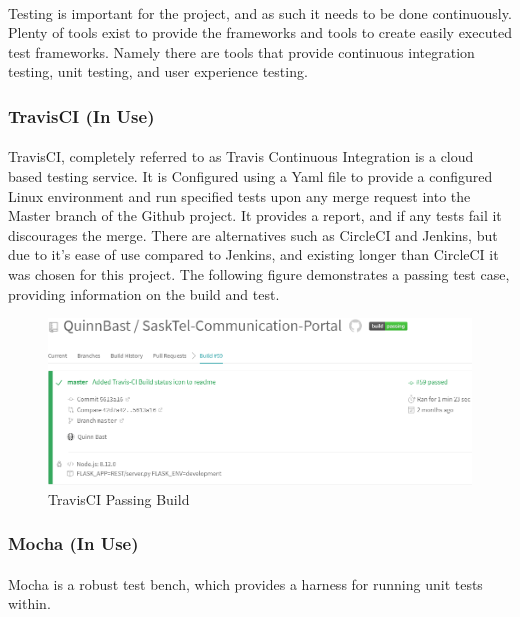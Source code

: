 \documentclass[12pt]{article}
\begin{document}
\paragraph{}	Testing is important for the project, and as such it needs to be done continuously. Plenty of tools exist to provide the frameworks and tools to create easily executed test frameworks. Namely there are tools that provide continuous integration testing, unit testing, and user experience testing. 

\subsubsection{TravisCI (In Use)}
\paragraph{}	TravisCI, completely referred to as Travis Continuous Integration is a cloud based testing service. It is Configured using a Yaml file to provide a configured Linux environment and run specified tests upon any merge request into the Master branch of the Github project. It provides a report, and if any tests fail it discourages the merge. There are alternatives such as CircleCI and Jenkins, but due to it's ease of use compared to Jenkins, and existing longer than CircleCI it was chosen for this project. The following figure demonstrates a passing test case, providing information on the build and test.\\

	\begin{figure}[h]
	\includegraphics[width=\textwidth]{TravisCI.png}
	\caption{TravisCI Passing Build}
	\end{figure}
	\newpage

\subsubsection{Mocha (In Use)}
\paragraph{}	Mocha is a robust test bench, which provides a harness for running unit tests within.
\end{document}
